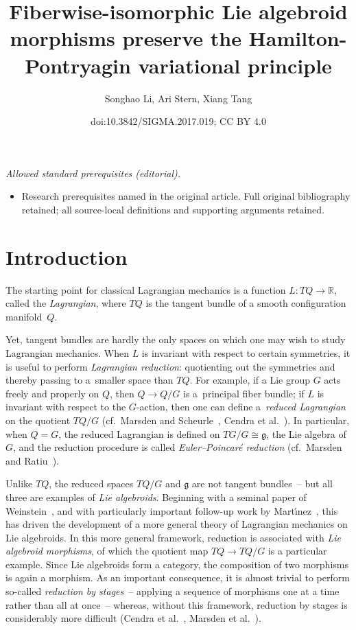 \documentclass[10pt,a4paper]{amsart}
\title{Fiberwise-isomorphic Lie algebroid morphisms preserve the Hamilton-Pontryagin variational principle}
\author{Songhao Li, Ari Stern, Xiang Tang}
\date{doi:10.3842/SIGMA.2017.019; CC BY 4.0}
\numberwithin{equation}{section}
\begin{document}
\maketitle
\noindent\textit{Allowed standard prerequisites (editorial).}\begin{itemize}
\item Research prerequisites named in the original article. Full original bibliography retained; all source-local definitions and supporting arguments retained.
\end{itemize}\medskip
\section{Introduction}

The starting point for classical Lagrangian mechanics is a function $ L \colon T Q \rightarrow \mathbb{R} $, called the \emph{Lagrangian}, where $ T Q $ is the tangent bundle of a smooth conf\/iguration manifold~$Q$.

Yet, tangent bundles are hardly the only spaces on which one may wish to study Lagrangian mechanics. When $L$ is invariant with respect to certain symmetries, it is useful to perform \emph{Lagrangian reduction}: quotienting out the symmetries and thereby passing to a~smaller space than $ T Q $. For example, if a Lie group $G$ acts freely and properly on $Q$, then $ Q \rightarrow Q / G $ is a~principal f\/iber bundle; if $L$ is invariant with respect to the $G$-action, then one can def\/ine a~\emph{reduced Lagrangian} on the quotient $ T Q / G $ (cf.\ Marsden and Scheurle~\cite{MaSc1993b}, Cendra et al.~\cite{CeMaRa2001}). In particular, when $ Q = G $, the reduced Lagrangian is def\/ined on $ T G / G \cong \mathfrak{g} $, the Lie algebra of~$G$, and the reduction procedure is called \emph{Euler--Poincar\'e reduction} (cf.\ Marsden and Ratiu~\cite[Chapter~13]{MaRa1999}).

Unlike $ T Q $, the reduced spaces $ T Q / G $ and $ \mathfrak{g} $ are not tangent bundles~-- but all three are examples of \emph{Lie algebroids}. Beginning with a seminal paper of Weinstein~\cite{Weinstein1996}, and with particularly important follow-up work by Mart\'{\i}nez~\cite{Martinez2001,Martinez2007,Martinez2008}, this has driven the development of a more general theory of Lagrangian mechanics on Lie
algebroids. In this more general framework, reduction is associated with \emph{Lie algebroid morphisms}, of which the quotient map $ T Q \rightarrow T Q / G $ is a particular example. Since Lie algebroids form a category, the composition of two morphisms is again a morphism. As an important consequence, it is almost trivial to perform so-called \emph{reduction by stages}~-- applying a sequence of morphisms one at a time rather than all at once~-- whereas, without this framework, reduction by stages is considerably more dif\/f\/icult (Cendra et al.~\cite{CeMaRa2001}, Marsden et al.~\cite{MaMiOrPeRa2007}).
\end{document}
